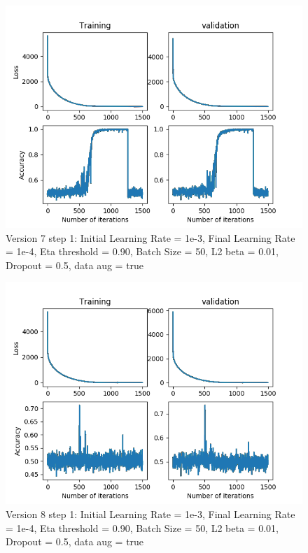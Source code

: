 \documentclass[12pt,reqno]{amsart}
\numberwithin{equation}{section}
\begin{document}
\begin{enumerate}
\begin{figure}[H]
\centering
\includegraphics[scale=0.6]{data_liquid25_version7_step1}
\caption{Version 7 step 1: Initial Learning Rate = 1e-3, Final Learning Rate = 1e-4, Eta threshold = 0.90, Batch Size = 50, L2 beta = 0.01, Dropout = 0.5, data aug = true}
\end{figure}

\begin{figure}[H]
\centering
\includegraphics[scale=0.6]{data_liquid25_version8_step1}
\caption{Version 8 step 1: Initial Learning Rate = 1e-3, Final Learning Rate = 1e-4, Eta threshold = 0.90, Batch Size = 50, L2 beta = 0.01, Dropout = 0.5, data aug = true}
\end{figure}


\end{enumerate}
\end{document}
